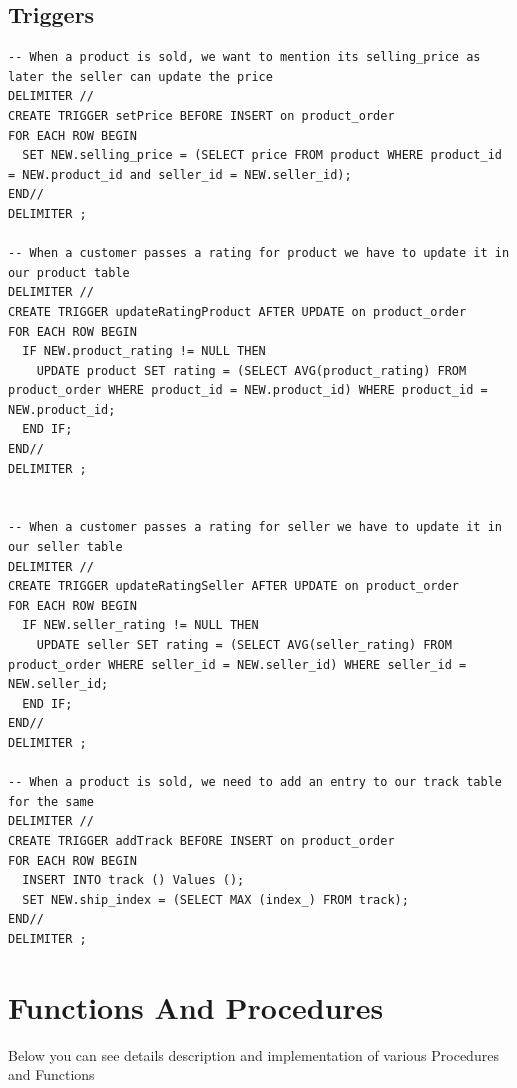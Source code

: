 \documentclass[a4paper,12pt]{article}
\begin{document}
\subsection{Triggers}
\begin{verbatim}
-- When a product is sold, we want to mention its selling_price as later the seller can update the price
DELIMITER //
CREATE TRIGGER setPrice BEFORE INSERT on product_order
FOR EACH ROW BEGIN
  SET NEW.selling_price = (SELECT price FROM product WHERE product_id = NEW.product_id and seller_id = NEW.seller_id);
END//
DELIMITER ;

-- When a customer passes a rating for product we have to update it in our product table
DELIMITER //
CREATE TRIGGER updateRatingProduct AFTER UPDATE on product_order
FOR EACH ROW BEGIN
  IF NEW.product_rating != NULL THEN
    UPDATE product SET rating = (SELECT AVG(product_rating) FROM product_order WHERE product_id = NEW.product_id) WHERE product_id = NEW.product_id;
  END IF;
END//
DELIMITER ;


-- When a customer passes a rating for seller we have to update it in our seller table
DELIMITER //
CREATE TRIGGER updateRatingSeller AFTER UPDATE on product_order
FOR EACH ROW BEGIN
  IF NEW.seller_rating != NULL THEN
    UPDATE seller SET rating = (SELECT AVG(seller_rating) FROM product_order WHERE seller_id = NEW.seller_id) WHERE seller_id = NEW.seller_id;
  END IF;
END//
DELIMITER ;

-- When a product is sold, we need to add an entry to our track table for the same
DELIMITER //
CREATE TRIGGER addTrack BEFORE INSERT on product_order
FOR EACH ROW BEGIN
  INSERT INTO track () Values ();
  SET NEW.ship_index = (SELECT MAX (index_) FROM track);
END//
DELIMITER ;
\end{verbatim}

\newpage
\section{Functions And Procedures}
Below you can see details description and implementation of various Procedures and Functions
\end{document}
